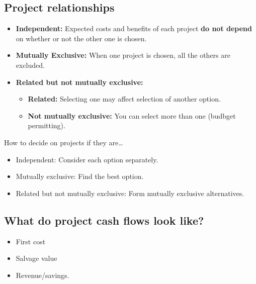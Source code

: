\subsection{Project relationships}
\begin{definition}
    \begin{itemize}
        \item \textbf{Independent:} Expected costs and benefits of each project \textbf{do not depend} on whether or not the other one is chosen.
        \item \textbf{Mutually Exclusive:} When one project is chosen, all the others are excluded.
        \item \textbf{Related but not mutually exclusive:}
        \begin{itemize}
            \item \textbf{Related:} Selecting one may affect selection of another option.
            \item \textbf{Not mutually exclusive:} You can select more than one (budbget permitting).
        \end{itemize}
    \end{itemize}
\end{definition}

\begin{intuition}
    How to decide on projects if they are\dots
    \begin{itemize}
        \item Independent: Consider each option separately.
        \item Mutually exclusive: Find the best option.
        \item Related but not mutually exclusive: Form mutually exclusive alternatives.
    \end{itemize}
\end{intuition}

\subsection{What do project cash flows look like?}
\begin{intuition}
    \begin{itemize}
        \item First cost
        \item Salvage value 
        \item Revenue/savings.
    \end{itemize}
\end{intuition}

